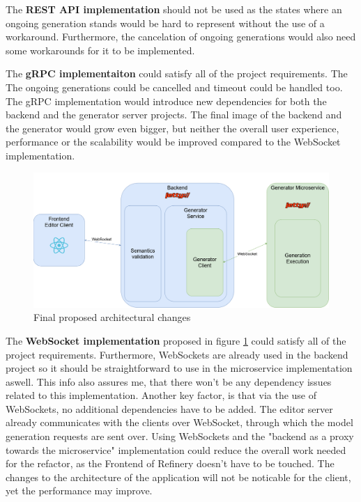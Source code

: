 	The \textbf{REST API implementation} should not be used as the states where an ongoing generation stands would be hard to represent
	without the use of a workaround. Furthermore, the cancelation of ongoing generations would also need some workarounds for it to be implemented.

	The \textbf{gRPC implementaiton} could satisfy all of the project requirements. The The ongoing generations could be cancelled and timeout could 
	be handled too. The gRPC implementation would introduce new dependencies for both the backend and the generator server projects.
	The final image of the backend and the generator would grow even bigger, but neither the overall user experience, performance
	or the scalability would be improved compared to the WebSocket implementation. 

	\begin{figure}[h!]
		\begin{center}
			\includegraphics[scale=0.3]{include/imgs/arch_plan.png}
			\caption{Final proposed architectural changes}
			\label{archplan}
		\end{center}
	\end{figure}

	The \textbf{WebSocket implementation} proposed in figure \ref{archplan} could satisfy all of the project requirements. Furthermore, WebSockets are already used 
	in the backend project so it should be straightforward to use in the microservice implementation aswell.
	This info also assures me, that there won't be any dependency issues related to this implementation. Another key factor, is that via the use of 
	WebSockets, no additional dependencies have to be added. The editor server already communicates with the clients over WebSocket, through which
	the model generation requests are sent over. Using WebSockets and the "backend as a proxy towards the microservice" implementation could 
	reduce the overall work needed for the refactor, 
	as the Frontend of Refinery 
	doesn't have to be touched. The changes to the architecture of the application will not be noticable for the client, yet the performance may improve.


